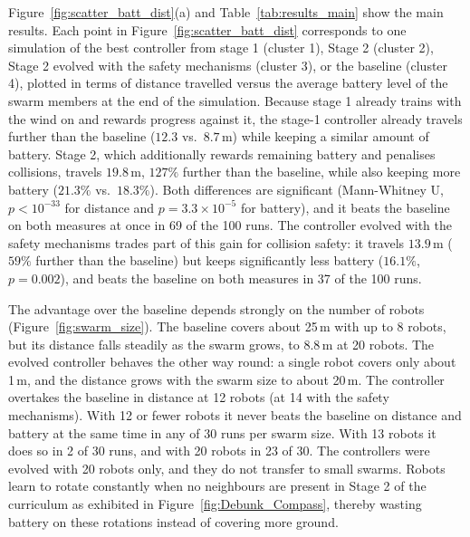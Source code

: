 \documentclass[runningheads]{llncs}
\begin{document}
Figure~\ref{fig:scatter_batt_dist}(a) and Table~\ref{tab:results_main} show the main results. Each point in Figure~\ref{fig:scatter_batt_dist} corresponds to one simulation of the best controller from stage 1 (cluster 1), Stage 2 (cluster 2), Stage 2 evolved with the safety mechanisms (cluster 3), or the baseline (cluster 4), plotted in terms of distance travelled versus the average battery level of the swarm members at the end of the simulation. Because stage 1 already trains with the wind on and rewards progress against it, the stage-1 controller already travels further than the baseline ($12.3$ vs.\ $8.7$\,m) while keeping a similar amount of battery. Stage 2, which additionally rewards remaining battery and penalises collisions, travels $19.8$\,m, $127\%$ further than the baseline, while also keeping more battery ($21.3\%$ vs.\ $18.3\%$). Both differences are significant (Mann-Whitney U, $p < 10^{-33}$ for distance and $p = 3.3\times10^{-5}$ for battery), and it beats the baseline on both measures at once in 69 of the 100 runs. The controller evolved with the safety mechanisms trades part of this gain for collision safety: it travels $13.9$\,m ($59\%$ further than the baseline) but keeps significantly less battery ($16.1\%$, $p = 0.002$), and beats the baseline on both measures in 37 of the 100 runs.

The advantage over the baseline depends strongly on the number of robots (Figure~\ref{fig:swarm_size}). The baseline covers about 25\,m with up to 8 robots, but its distance falls steadily as the swarm grows, to 8.8\,m at 20 robots. The evolved controller behaves the other way round: a single robot covers only about 1\,m, and the distance grows with the swarm size to about 20\,m. The controller overtakes the baseline in distance at 12 robots (at 14 with the safety mechanisms). With 12 or fewer robots it never beats the baseline on distance and battery at the same time in any of 30 runs per swarm size. With 13 robots it does so in 2 of 30 runs, and with 20 robots in 23 of 30. The controllers were evolved with 20 robots only, and they do not transfer to small swarms. Robots learn to rotate constantly when no neighbours are present in Stage 2 of the curriculum as exhibited in Figure~\ref{fig:Debunk_Compass}, thereby wasting battery on these rotations instead of covering more ground.
\end{document}
